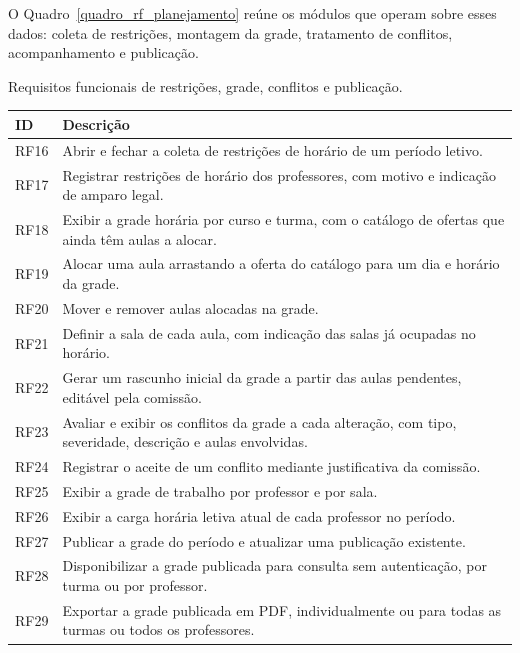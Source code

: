 O Quadro~\ref{quadro_rf_planejamento} reúne os módulos que operam sobre esses dados: coleta de restrições, montagem da grade, tratamento de conflitos, acompanhamento e publicação.

\begin{quadro}[H]
\centering
\small
\renewcommand{\arraystretch}{1.25}
\caption{Requisitos funcionais de restrições, grade, conflitos e publicação.}
\label{quadro_rf_planejamento}
\begin{tabularx}{\textwidth}{|I|X|}
\hline
\textbf{ID} & \textbf{Descrição} \\ \hline
{}
RF16 & Abrir e fechar a coleta de restrições de horário de um período letivo. \\ \hline
RF17 & Registrar restrições de horário dos professores, com motivo e indicação de amparo legal. \\ \hline
{}
RF18 & Exibir a grade horária por curso e turma, com o catálogo de ofertas que ainda têm aulas a alocar. \\ \hline
RF19 & Alocar uma aula arrastando a oferta do catálogo para um dia e horário da grade. \\ \hline
RF20 & Mover e remover aulas alocadas na grade. \\ \hline
RF21 & Definir a sala de cada aula, com indicação das salas já ocupadas no horário. \\ \hline
RF22 & Gerar um rascunho inicial da grade a partir das aulas pendentes, editável pela comissão. \\ \hline
{}
RF23 & Avaliar e exibir os conflitos da grade a cada alteração, com tipo, severidade, descrição e aulas envolvidas. \\ \hline
RF24 & Registrar o aceite de um conflito mediante justificativa da comissão. \\ \hline
{}
RF25 & Exibir a grade de trabalho por professor e por sala. \\ \hline
RF26 & Exibir a carga horária letiva atual de cada professor no período. \\ \hline
{}
RF27 & Publicar a grade do período e atualizar uma publicação existente. \\ \hline
RF28 & Disponibilizar a grade publicada para consulta sem autenticação, por turma ou por professor. \\ \hline
RF29 & Exportar a grade publicada em PDF, individualmente ou para todas as turmas ou todos os professores. \\ \hline
\end{tabularx}
\end{quadro}

